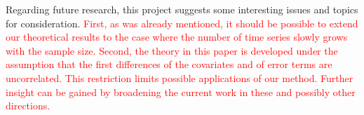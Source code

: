 \documentclass[a4paper,12pt]{article}
\begin{document}
Regarding future research, this project suggests some interesting issues and topics for consideration. \textcolor{red}{First, as was already mentioned, it should be possible to extend our theoretical results to the case where the number of time series slowly grows with the sample size. Second, the theory in this paper is developed under the assumption that the first differences of the covariates and of error terms are uncorrelated. This restriction limits possible applications of our method. Further insight can be gained by broadening the current work in these and possibly other directions.}

\newpage

{\small
\setlength{\bibsep}{0.55em}
}

\allowdisplaybreaks[3]

\end{document}
